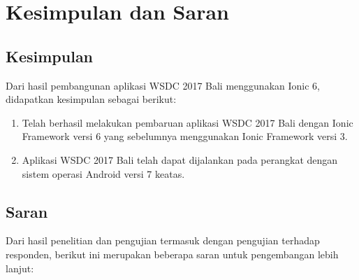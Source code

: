 \chapter{Kesimpulan dan Saran}
\label{chap:kesimpulanSaran}

\section{Kesimpulan} 
\label{sec:kesimpulan}

Dari hasil pembangunan aplikasi WSDC 2017 Bali menggunakan Ionic 6, didapatkan kesimpulan sebagai berikut:

\begin{enumerate}
	\item Telah berhasil melakukan pembaruan aplikasi WSDC 2017 Bali dengan Ionic Framework versi 6 yang sebelumnya menggunakan Ionic Framework versi 3.
	\item Aplikasi WSDC 2017 Bali telah dapat dijalankan pada perangkat dengan sistem operasi Android versi 7 keatas.
\end{enumerate}

\section{Saran} 
\label{sec:saran}

Dari hasil penelitian dan pengujian termasuk dengan pengujian terhadap responden, berikut ini merupakan beberapa saran untuk pengembangan lebih lanjut: